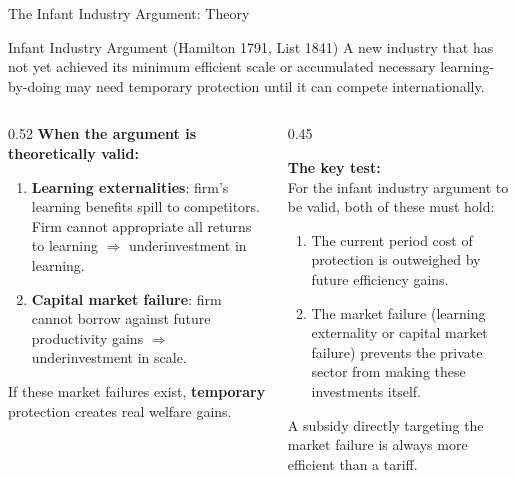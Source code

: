 \documentclass[aspectratio=169]{beamer}
\begin{document}
\begin{frame}{The Infant Industry Argument: Theory}
\begin{block}{Infant Industry Argument (Hamilton 1791, List 1841)}
  A new industry that has not yet achieved its minimum efficient scale or accumulated necessary learning-by-doing may need temporary protection until it can compete internationally.
\end{block}
\vspace{0.3em}
\begin{columns}
\begin{column}{0.52\textwidth}
\textbf{When the argument is theoretically valid:}
\begin{enumerate}
  \item \textbf{Learning externalities}: firm's learning benefits spill to competitors. Firm cannot appropriate all returns to learning $\Rightarrow$ underinvestment in learning.
  \item \textbf{Capital market failure}: firm cannot borrow against future productivity gains $\Rightarrow$ underinvestment in scale.
\end{enumerate}
\vspace{0.3em}
If these market failures exist, \textbf{temporary} protection creates real welfare gains.
\end{column}
\begin{column}{0.45\textwidth}
\begin{varbox}
\small\textbf{The key test:}\\
For the infant industry argument to be valid, both of these must hold:
\begin{enumerate}\small
  \item The current period cost of protection is outweighed by future efficiency gains.
  \item The market failure (learning externality or capital market failure) prevents the private sector from making these investments itself.
\end{enumerate}
A subsidy directly targeting the market failure is always more efficient than a tariff.
\end{varbox}
\end{column}
\end{columns}
\end{frame}
\end{document}
